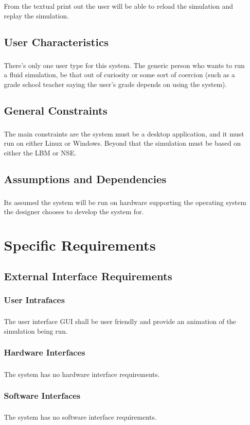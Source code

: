 \documentclass{scrartcl}
\begin{document}
\subparagraph{}
From  the textual print out the user will be able to reload the simulation and replay the simulation.

\subsection{User Characteristics}
\subparagraph{}
There’s only one user type for this system. The generic person who wants to run a fluid simulation, be that out of curiosity or some sort of coercion (such as a grade school teacher saying the user’s grade depends on using the system). 

\subsection{General Constraints}
\subparagraph{}
The main constraints are the system must be a desktop application, and it must run on either Linux or Windows. Beyond that the simulation must be based on either the LBM or NSE.

\subsection{Assumptions and Dependencies}
\subparagraph{}
Its assumed the system will be run on hardware supporting the operating system the designer chooses to develop the system for.


\section{Specific Requirements}
\subsection{External Interface Requirements}
\subsubsection{User Intrafaces}
\subparagraph{}
The user interface GUI shall be user friendly and provide an animation of the simulation being run.

\subsubsection{Hardware Interfaces}
\subparagraph{}
The system has no hardware interface requirements.

\subsubsection{Software Interfaces}
\subparagraph{}
The system has no software interface requirements.
\end{document}
